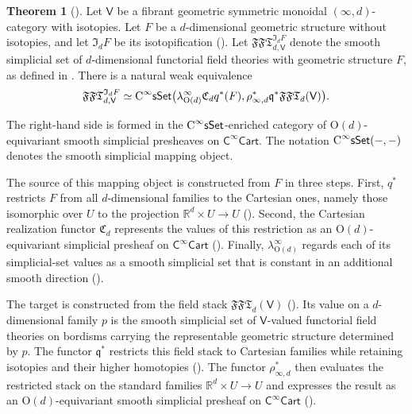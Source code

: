 \documentclass{amsart}
\newcommand{\cat}[1]{\mathsf{#1}}
\newcommand{\sset}{\cat{sSet}}
\newcommand{\we}{\simeq}
\newcommand{\CsSet}{\textnormal{C}^{\infty}\sset}
\newcommand{\Cart}{\cat{C}^{\infty}\cat{Cart}}
\newcommand{\FFT}{\mathfrak{FFT}}
\newcommand{\Cc}{\mathfrak{C}}
\newcommand{\RR}{{\mathbb{R}}}
\theoremstyle{definition}
\newtheorem*{maintheorem}{Theorem}
\numberwithin{equation}{subsection}
\numberwithin{subsubsection}{subsection}
\begin{document}
\begin{maintheorem}[]
  Let \(\cat{V}\) be a fibrant geometric symmetric monoidal
  \((\infty,d)\)-category with isotopies. Let \(F\) be a \(d\)-dimensional
  geometric structure without isotopies, and let \(\mathfrak{I}_{d}F\) be its
  isotopification (). Let
  \(\FFT_{d,\cat{V}}^{\mathfrak{I}_{d}F}\) denote the smooth simplicial set of
  \(d\)-dimensional functorial field theories with geometric structure \(F\), as
  defined in . There is a natural weak
  equivalence
  \[
    \FFT_{d,\cat{V}}^{\mathfrak{I}_{d}F}\we
    \CsSet\bigl(\lambda^{\infty}_{\mathrm{O}(d)}\Cc_{d}q^{*}(F),\rho^{*}_{\infty,d}\mathfrak{q}^{*}\FFT_{d}(\cat{V})\bigr).
  \]
\end{maintheorem}

The right-hand side is formed in the \(\CsSet\)-enriched category of
\(\mathrm{O}(d)\)-equivariant smooth simplicial presheaves on \(\Cart\). The
notation \(\CsSet(-,-)\) denotes the smooth simplicial mapping object.

The source of this mapping object is constructed from \(F\) in three steps.
First, \(q^{*}\) restricts \(F\) from all \(d\)-dimensional families to the
Cartesian ones, namely those isomorphic over \(U\) to the projection
\(\RR^{d}\times U\to U\)
(). Second, the Cartesian
realization functor \(\Cc_d\) represents the values of this restriction as an
\(\mathrm{O}(d)\)-equivariant simplicial presheaf on \(\Cart\)
(). Finally,
\(\lambda^{\infty}_{\mathrm{O}(d)}\) regards each of its simplicial-set values
as a smooth simplicial set that is constant in an additional smooth direction
().

The target is constructed from the field stack \(\FFT_d(\cat{V})\)
(). Its value on a \(d\)-dimensional family
\(p\) is the smooth simplicial set of \(\cat{V}\)-valued functorial field
theories on bordisms carrying the representable geometric structure determined
by \(p\). The functor \(\mathfrak{q}^{*}\) restricts this field stack to
Cartesian families while retaining isotopies and their higher homotopies
(). The functor
\(\rho^{*}_{\infty,d}\) then evaluates the restricted stack on the standard
families \(\RR^{d}\times U\to U\) and expresses the result as an
\(\mathrm{O}(d)\)-equivariant smooth simplicial presheaf on \(\Cart\)
().
\end{document}

